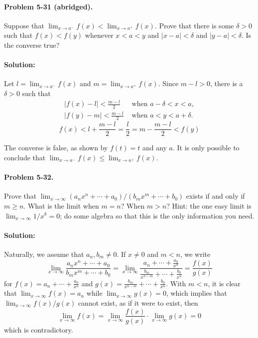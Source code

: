 \documentclass{article}
\begin{document}
\paragraph{Problem 5-31 (abridged).} Suppose that $\lim_{x \rightarrow a^-}f(x)
< \lim_{x \rightarrow a^+}f(x)$. Prove that there is some $\delta > 0$ such
that $f(x) < f(y)$ whenever $x < a < y$ and $|x - a| < \delta$ and $|y - a| <
\delta$. Is the converse true?

\paragraph{Solution:} Let $l = \lim_{x \rightarrow a^-}f(x)$ and $m = \lim_{x
\rightarrow a^+}f(x)$. Since $m - l > 0$, there is a $\delta > 0$ such that
\begin{align*}
  |f(x) - l| < \frac{m - l}{2} &\text{ when } a - \delta < x < a, \\
  |f(y) - m| < \frac{m - l}{2} &\text{ when } a < y < a + \delta.
\end{align*}
\begin{equation*}
  f(x) < l + \frac{m - l}{2} = \frac{l}{2} = m - \frac{m - l}{2} < f(y)
\end{equation*}

The converse is false, as shown by $f(t) = t$ and any $a$. It is only possible
to conclude that $\lim_{x \rightarrow a^-}f(x) \leq \lim_{x \rightarrow a^+}
f(x)$.

\paragraph{Problem 5-32.} Prove that $\lim_{x \rightarrow \infty}(a_nx^n +
\cdots + a_0)/(b_mx^m + \cdots + b_0)$ exists if and only if $m \geq n$. What
is the limit when $m = n$? When $m > n$? Hint: the one easy limit is $\lim_{x
\rightarrow \infty}1/x^k = 0$; do some algebra so that this is the only
information you need.

\paragraph{Solution:} Naturally, we assume that $a_n, b_m \neq 0$. If $x \neq
0$ and $m < n$, we write \begin{equation*}
  \lim_{x \rightarrow \infty}\frac{a_nx^n + \cdots + a_0}{b_mx^m + \cdots + b_0
    } = \lim_{x \rightarrow \infty}\frac{a_n + \cdots + \frac{a_0}{x^n}}{\frac{
    b_m}{x^{n - m}} + \cdots + \frac{b_0}{x^n}} = \frac{f(x)}{g(x)}
\end{equation*} for $f(x) = a_n + \cdots + \frac{a_0}{x^n}$ and $g(x) = \frac{
b_m}{x^{n - m}} + \cdots + \frac{b_0}{x^n}$. With $m < n$, it is clear that
$\lim_{x \rightarrow \infty}f(x) = a_n$ while $\lim_{x \rightarrow \infty}g(x)
= 0$, which implies that $\lim_{x \rightarrow \infty}f(x)/g(x)$ cannot exist,
as if it were to exist, then \begin{equation*}
  \lim_{x \rightarrow \infty}f(x) = \lim_{x \rightarrow \infty}\frac{f(x)}{g(x)
  } \cdot \lim_{x \rightarrow \infty}g(x) = 0
\end{equation*} which is contradictory.
\end{document}
